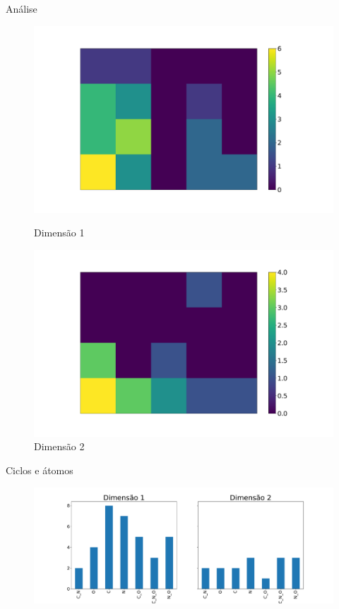 \documentclass[10pt]{beamer}
\begin{document}
\begin{frame}{Análise}
  \begin{figure}
    \centering
    \begin{minipage}{0.45\textwidth}
        \centering
        \includegraphics[width=1.1\textwidth]{images/heatmap_1.pdf} %
        \caption{Dimensão 1}
    \end{minipage}\hfill
    \begin{minipage}{0.45\textwidth}
        \centering
        \includegraphics[width=1.1\textwidth]{images/heatmap_2} %
        \caption{Dimensão 2}
    \end{minipage}
  \end{figure}
\end{frame}

\begin{frame}{Ciclos e átomos}
    \begin{figure}
        \centering
        \includegraphics[width=1.0\textwidth]{images/plt_dim.pdf}
    \end{figure}
\end{frame}
\end{document}
